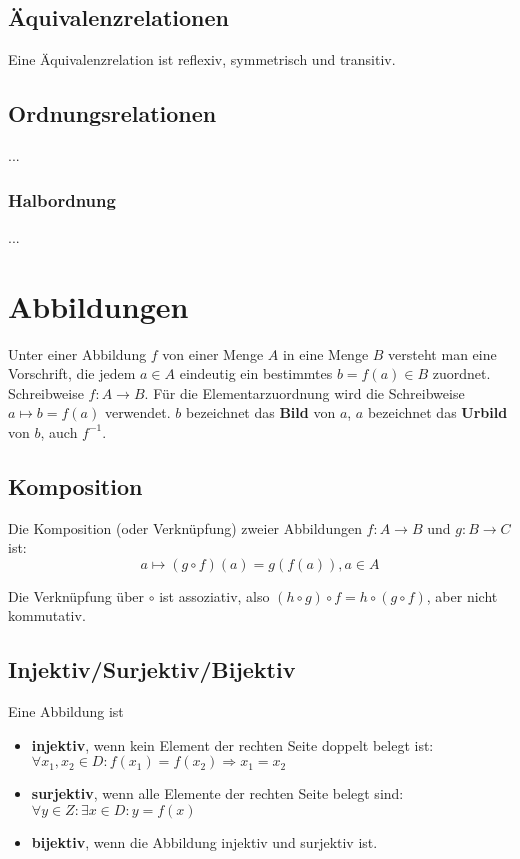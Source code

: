 \documentclass[10pt,a4paper,twoside,twocolumn]{article}
\begin{document}
	\subsection{Äquivalenzrelationen}
	
	Eine Äquivalenzrelation ist reflexiv, symmetrisch und transitiv.
	
	\subsection{Ordnungsrelationen}
	
	...
	
	\subsubsection{Halbordnung}
	
	...
	
	\section{Abbildungen}
	
	Unter einer Abbildung $ f $ von einer Menge $ A $ in eine Menge $ B $ versteht man eine Vorschrift, die jedem $ a \in A $ eindeutig ein bestimmtes $ b = f(a) \in B $ zuordnet. Schreibweise $ f : A \to B $. Für die Elementarzuordnung wird die Schreibweise $ a \mapsto b = f(a) $ verwendet. $ b $ bezeichnet das \textbf{Bild} von $ a $, $ a $ bezeichnet das \textbf{Urbild} von $ b $, auch $ f^{-1} $.
	
	\subsection{Komposition}
	
	Die Komposition (oder Verknüpfung) zweier Abbildungen $ f : A \to B $ und $ g : B \to C $ ist:
	\[ a \mapsto (g \circ f)(a) = g(f(a)), a \in A \]
	
	Die Verknüpfung über $ \circ $ ist assoziativ, also $ (h \circ g) \circ f = h \circ (g \circ f) $, aber nicht kommutativ.
	
	\subsection{Injektiv/Surjektiv/Bijektiv}
	Eine Abbildung ist
	\begin{itemize}
		\setlength\itemsep{0em}
		\item \textbf{injektiv}, wenn kein Element der rechten Seite doppelt belegt ist: $ \forall x_1, x_2 \in D: f(x_1)=f(x_2) \Rightarrow x_1=x_2 $
		\item \textbf{surjektiv}, wenn alle Elemente der rechten Seite belegt sind: $ \forall y\in Z: \exists x\in D: y=f(x) $
		\item \textbf{bijektiv}, wenn die Abbildung injektiv und surjektiv ist.
	\end{itemize}
	
\end{document}
